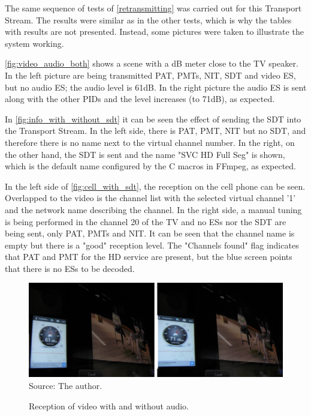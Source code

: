 \documentclass[
	12pt,				%
	openright,			%
	twoside,			%
	a4paper,			%
	brazil,
	french,				%
	english
	]{abntex2}
\begin{document}
The same sequence of tests of \autoref{retransmitting} was carried out for this Transport Stream. The results were similar as in the other tests, which is why the tables with results are not presented. Instead, some pictures were taken to illustrate the system working.

\autoref{fig:video_audio_both} shows a scene with a dB meter close to the TV speaker. In the left picture are being transmitted PAT, PMTs, NIT, SDT and video ES, but no audio ES; the audio level is 61dB. In the right picture the audio ES is sent along with the other PIDs and the level increases (to 71dB), as expected.

In \autoref{fig:info_with_without_sdt} it can be seen the effect of sending the SDT into the Transport Stream. In the left side, there is PAT, PMT, NIT but no SDT, and therefore there is no name next to the virtual channel number. In the right, on the other hand, the SDT is sent and the name "SVC HD Full Seg" is shown, which is the default name configured by the C macros in FFmpeg, as expected.

In the left side of \autoref{fig:cell_with_sdt}, the reception on the cell phone can be seen. Overlapped to the video is the channel list with the selected virtual channel '1' and the network name describing the channel. In the right side, a manual tuning is being performed in the channel 20 of the TV and no ESs nor the SDT are being sent, only PAT, PMTs and NIT. It can be seen that the channel name is empty but there is a "good" reception level. The "Channels found" flag indicates that PAT and PMT for the HD service are present, but the blue screen points that there is no ESs to be decoded.

\begin{figure}[!h]
\centering
\includegraphics[width=0.9\linewidth]{figuras/video_audio_both.jpg}
\\Source: The author.
\caption{Reception of video with and without audio.}
\label{fig:video_audio_both}
\end{figure}
\end{document}

